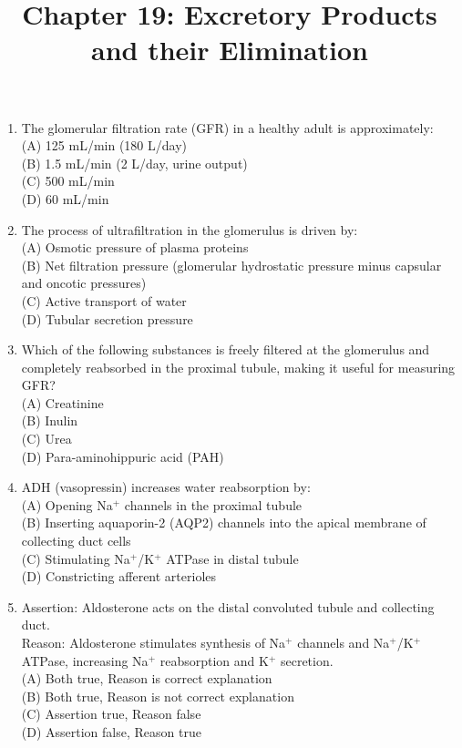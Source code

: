 \documentclass{article}
\begin{document}
\title{Chapter 19: Excretory Products and their Elimination}
\date{}
\maketitle

\begin{enumerate}[label=Q\arabic*.]

\item The glomerular filtration rate (GFR) in a healthy adult is approximately:
\\(A) 125 mL/min (180 L/day)
\\(B) 1.5 mL/min (2 L/day, urine output)
\\(C) 500 mL/min
\\(D) 60 mL/min

\item The process of ultrafiltration in the glomerulus is driven by:
\\(A) Osmotic pressure of plasma proteins
\\(B) Net filtration pressure (glomerular hydrostatic pressure minus capsular and oncotic pressures)
\\(C) Active transport of water
\\(D) Tubular secretion pressure

\item Which of the following substances is freely filtered at the glomerulus and completely reabsorbed in the proximal tubule, making it useful for measuring GFR?
\\(A) Creatinine
\\(B) Inulin
\\(C) Urea
\\(D) Para-aminohippuric acid (PAH)

\item ADH (vasopressin) increases water reabsorption by:
\\(A) Opening Na$^+$ channels in the proximal tubule
\\(B) Inserting aquaporin-2 (AQP2) channels into the apical membrane of collecting duct cells
\\(C) Stimulating Na$^+$/K$^+$ ATPase in distal tubule
\\(D) Constricting afferent arterioles

\item Assertion: Aldosterone acts on the distal convoluted tubule and collecting duct.\\
Reason: Aldosterone stimulates synthesis of Na$^+$ channels and Na$^+$/K$^+$ ATPase, increasing Na$^+$ reabsorption and K$^+$ secretion.
\\(A) Both true, Reason is correct explanation
\\(B) Both true, Reason is not correct explanation
\\(C) Assertion true, Reason false
\\(D) Assertion false, Reason true


\end{enumerate}
\end{document}
